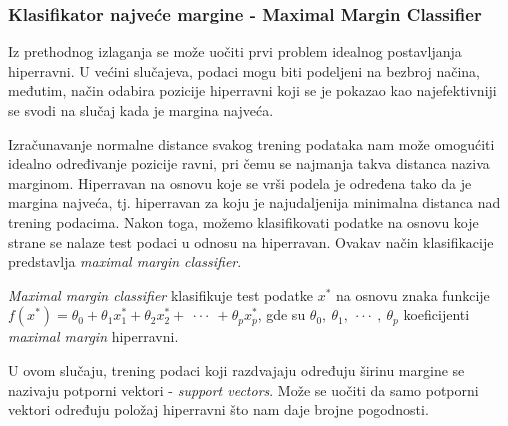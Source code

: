 \subsubsection{Klasifikator najveće margine - Maximal Margin Classifier}
Iz prethodnog izlaganja se može uočiti prvi problem idealnog postavljanja hiperravni.
U većini slučajeva, podaci mogu biti podeljeni na bezbroj načina, međutim, način odabira pozicije
hiperravni koji se je pokazao kao najefektivniji se svodi na slučaj kada je margina najveća.

Izračunavanje normalne distance svakog trening podataka nam može omogućiti idealno određivanje pozicije ravni, pri čemu se
najmanja takva distanca naziva marginom. Hiperravan na osnovu koje se vrši podela je određena tako da je margina najveća,
tj. hiperravan za koju je najudaljenija minimalna distanca nad trening podacima. Nakon toga, možemo klasifikovati podatke
na osnovu koje strane se nalaze test podaci u odnosu na hiperravan. Ovakav način klasifikacije predstavlja \textit{maximal margin classifier}.

\textit{Maximal margin classifier} klasifikuje test podatke $x^*$ na osnovu znaka funkcije $f\left(x^*\right) = \theta_0 + \theta_1x^{*}_{1} + \theta_2x^{*}_{2} + \ \cdot\cdot\cdot \ + \theta_px^{*}_{p}$,
gde su $\theta_0, \ \theta_1, \ \cdot\cdot\cdot \ , \ \theta_p$ koeficijenti \textit{maximal margin} hiperravni.

U ovom slučaju, trening podaci koji razdvajaju određuju širinu margine se nazivaju potporni vektori - \textit{support vectors}.
Može se uočiti da samo potporni vektori određuju položaj hiperravni što nam daje brojne pogodnosti.

